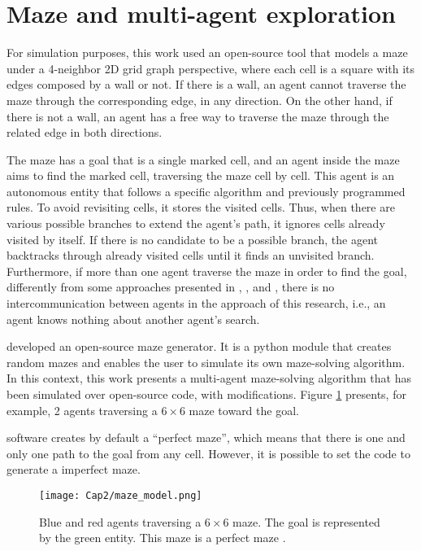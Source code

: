 \label{section_models}
\section{Maze and multi-agent exploration}
\label{section_models_maze}
For simulation purposes, this work used an open-source tool that models a maze under a 4-neighbor 2D grid graph perspective, where each cell is a square with its edges composed by a wall or not. If there is a wall, an agent cannot traverse the maze through the corresponding edge, in any direction. On the other hand, if there is not a wall, an agent has a free way to traverse the maze through the related edge in both directions.

The maze has a goal that is a single marked cell, and an agent inside the maze aims to find the marked cell, traversing the maze cell by cell. This agent is an autonomous entity that follows a specific algorithm and previously programmed rules. To avoid revisiting cells, it stores the visited cells. Thus, when there are various possible branches to extend the agent's path, it ignores cells already visited by itself. If there is no candidate to be a possible branch, the agent backtracks through already visited cells until it finds an unvisited branch. Furthermore, if more than one agent traverse the maze in order to find the goal, differently from some approaches presented in , , and , there is no intercommunication between agents in the approach of this research, i.e., an agent knows nothing about another agent's search.

 developed an open-source maze generator. It is a python module that creates random mazes and enables the user to simulate its own maze-solving algorithm. In this context, this work presents a multi-agent maze-solving algorithm that has been simulated over  open-source code, with modifications. Figure \ref{maze_model} presents, for example, 2 agents traversing a $6 \times 6$ maze toward the goal.

 software creates by default a ``perfect maze'', which means that there is one and only one path to the goal from any cell. However, it is possible to set the code to generate a imperfect maze.

\begin{figure}[ht!]
\centering
\texttt{[image: Cap2/maze\_model.png]}
\caption{Blue and red agents traversing a $6\times 6$ maze. The goal is represented by the green entity. This maze is a perfect maze \cite{Muhammad2021}.}
\label{maze_model}
\end{figure}

